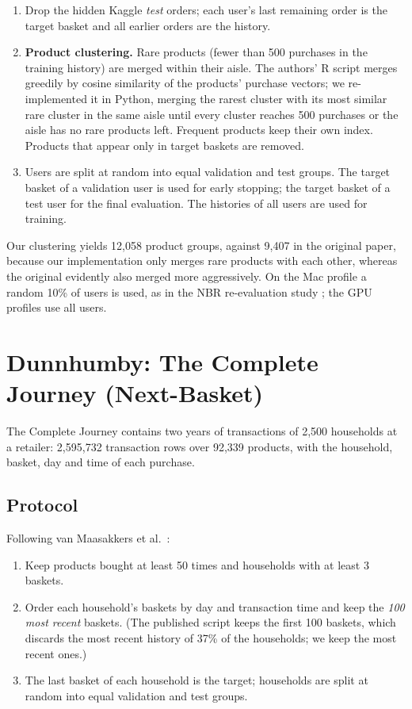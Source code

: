 \begin{enumerate}
    \item Drop the hidden Kaggle \emph{test} orders; each user's last remaining
          order is the target basket and all earlier orders are the history.
    \item \textbf{Product clustering.} Rare products (fewer than 500 purchases in
          the training history) are merged within their aisle. The authors'
          R script merges greedily by cosine similarity of the products' purchase
          vectors; we re-implemented it in Python, merging the rarest cluster with
          its most similar rare cluster in the same aisle until every cluster
          reaches 500 purchases or the aisle has no rare products left. Frequent
          products keep their own index. Products that appear only in target
          baskets are removed.
    \item Users are split at random into equal validation and test groups. The
          target basket of a validation user is used for early stopping; the
          target basket of a test user for the final evaluation. The histories of
          all users are used for training.
\end{enumerate}

Our clustering yields 12,058 product groups, against 9,407 in the original
paper, because our implementation only merges rare products with each other,
whereas the original evidently also merged more aggressively. On the Mac profile a random 10\% of users is used, as in the
NBR re-evaluation study \cite{li2023}; the GPU profiles use all users.

\section{Dunnhumby: The Complete Journey (Next-Basket)}

The Complete Journey contains two years of transactions of 2,500 households at a
retailer: 2,595,732 transaction rows over 92,339 products, with the household,
basket, day and time of each purchase.

\subsection{Protocol}

Following van Maasakkers et al.\ \cite{vanmaasakkers2023}:

\begin{enumerate}
    \item Keep products bought at least 50 times and households with at least 3
          baskets.
    \item Order each household's baskets by day and transaction time and keep the
          \emph{100 most recent} baskets. (The published script keeps the first
          100 baskets, which discards the most recent history of 37\% of the
          households; we keep the most recent ones.)
    \item The last basket of each household is the target; households are split
          at random into equal validation and test groups.
\end{enumerate}

